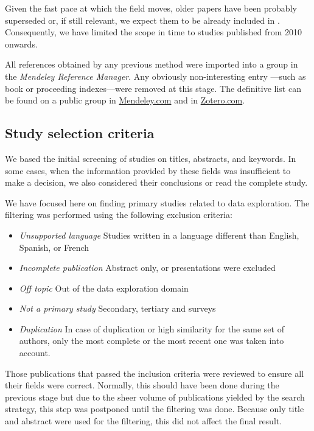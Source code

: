 Given the fast pace at which the field moves, older papers have been probably
superseded or, if still relevant, we expect them to be already included in \cite{Idreos2015}.
Consequently, we have limited the scope in time to studies published from 2010 onwards.

All references obtained by any previous method were imported into
a group in the \emph{Mendeley Reference Manager}. Any obviously non-interesting entry
---such as book or proceeding indexes---were removed at this stage.
The definitive list can be found on a public group in
\href{https://www.mendeley.com/community/interactive-data-exploration-in-science-systematic-mapping/}{Mendeley.com} and in
\href{https://www.zotero.org/groups/4517638/interactive-data-exploration-in-science-systematic-mapping/library}{Zotero.com}\footnotemark.


\subsection{Study selection criteria}
We based the initial screening of studies on titles, abstracts, and keywords.
In some cases, when the information provided by these fields was
insufficient to make a decision, we also considered their conclusions
or read the complete study.

We have focused here on finding primary studies related to data exploration.
The filtering was performed using the following exclusion criteria:

\begin{itemize}
  \item \emph{Unsupported language} Studies written in a language different than
  English, Spanish, or French
  \item \emph{Incomplete publication} Abstract only, or presentations were excluded
  \item \emph{Off topic} Out of the data exploration domain
  \item \emph{Not a primary study} Secondary, tertiary and surveys
  \item \emph{Duplication} In case of duplication or high similarity for the same
  set of authors, only the most complete or the most recent one was
  taken into account.
\end{itemize}

Those publications that passed the inclusion criteria were reviewed to ensure all their fields were correct. Normally, this should have been done during
the previous stage but due to the sheer volume of publications yielded by the
search strategy, this step was postponed until the filtering was done. Because only
title and abstract were used for the filtering, this did not affect the final
result.

